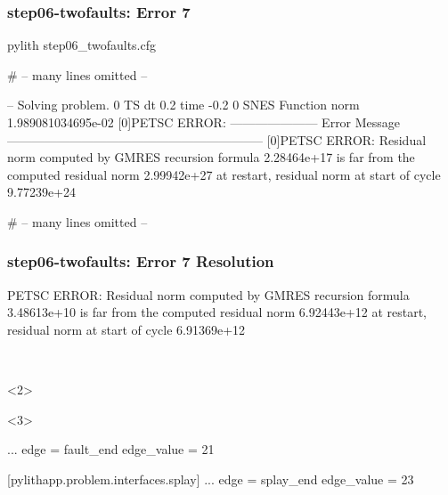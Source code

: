 \documentclass[aspectratio=169]{beamer}
\begin{document}
\begin{frame}[fragile]
  \frametitle{{\ttfamily step06-twofaults}: Error 7}

\begin{bashcode}
pylith step06_twofaults.cfg

# -- many lines omitted --

 -- Solving problem.
0 TS dt 0.2 time -0.2
    0 SNES Function norm 1.989081034695e-02
[0]PETSC ERROR: --------------------- Error Message --------------------------------------------------------------
[0]PETSC ERROR: Residual norm computed by GMRES recursion formula 2.28464e+17 is far from the computed residual norm 2.99942e+27 at restart, residual norm at start of cycle 9.77239e+24

# -- many lines omitted --
\end{bashcode}

\end{frame}


\begin{frame}[t,fragile]
  \frametitle{{\ttfamily step06-twofaults}: Error 7 Resolution}

  \tserror
  \begin{bashcode}
[0]PETSC ERROR: Residual norm computed by GMRES recursion formula 3.48613e+10 is far from the computed residual norm 6.92443e+12 at restart, residual norm at start of cycle 6.91369e+12
  \end{bashcode}

  \pause\\[1pt]

  \begin{onlyenv}<2>
  \end{onlyenv}
  \begin{onlyenv}<3>
  \begin{cfgcode}
      ...
      edge = fault_end
      edge_value = 21

      [pylithapp.problem.interfaces.splay]
      ...
      edge = splay_end
      edge_value = 23
  \end{cfgcode}
  \end{onlyenv}

\end{frame}
\end{document}
